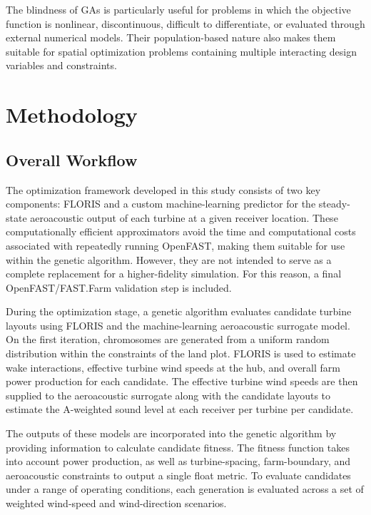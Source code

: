 \documentclass[11pt]{article}
\begin{document}
The blindness of GAs is particularly useful for problems in which the objective function is nonlinear, discontinuous, difficult to differentiate, or evaluated through external numerical models. Their population-based nature also makes them suitable for spatial optimization problems containing multiple interacting design variables and constraints.


\section{Methodology}

\subsection{Overall Workflow}

The optimization framework developed in this study consists of two key components: FLORIS and a custom machine-learning predictor for the steady-state aeroacoustic output of each turbine at a given receiver location. These computationally efficient approximators avoid the time and computational costs associated with repeatedly running OpenFAST, making them suitable for use within the genetic algorithm. However, they are not intended to serve as a complete replacement for a higher-fidelity simulation. For this reason, a final OpenFAST/FAST.Farm validation step is included.

During the optimization stage, a genetic algorithm evaluates candidate turbine layouts using FLORIS and the machine-learning aeroacoustic surrogate model. On the first iteration, chromosomes are generated from a uniform random distribution within the constraints of the land plot. FLORIS is used to estimate wake interactions, effective turbine wind speeds at the hub, and overall farm power production for each candidate. The effective turbine wind speeds are then supplied to the aeroacoustic surrogate along with the candidate layouts to estimate the A-weighted sound level at each receiver per turbine per candidate.

The outputs of these models are incorporated into the genetic algorithm by providing information to calculate candidate fitness. The fitness function takes into account power production, as well as turbine-spacing, farm-boundary, and aeroacoustic constraints to output a single float metric. To evaluate candidates under a range of operating conditions, each generation is evaluated across a set of weighted wind-speed and wind-direction scenarios.
\end{document}
